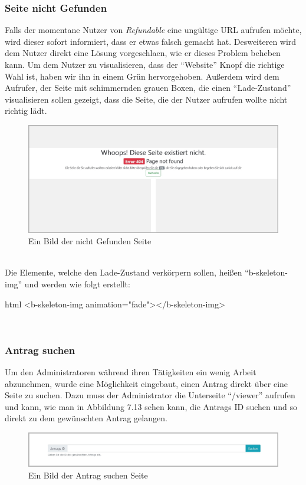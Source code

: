 \subsubsection{Seite nicht Gefunden}
\label{chapter:implementierung-frontend-komponenten-notfound}
Falls der momentane Nutzer von \textit{Refundable} eine ungültige URL aufrufen möchte, wird dieser sofort informiert, dass er etwas falsch gemacht hat. Desweiteren wird dem Nutzer direkt eine Lösung vorgeschlaen, wie er dieses Problem beheben kann. Um dem Nutzer zu visualisieren, dass der \enquote{Website} Knopf die richtige Wahl ist, haben wir ihn in einem Grün hervorgehoben. Außerdem wird dem Aufrufer, der Seite mit schimmernden grauen Boxen, die einen \enquote{Lade-Zustand} visualisieren sollen gezeigt, dass die Seite, die der Nutzer aufrufen wollte nicht richtig lädt.
\begin{figure}[H]
	\centering
	\includegraphics[width=1\linewidth]{images/website/notfound}
	\caption[Neuer Schulantrag]{Ein Bild der nicht Gefunden Seite}
	\label{fig:notfoundsite}
\end{figure}
~\\
Die Elemente, welche den Lade-Zustand verkörpern sollen, heißen \enquote{b-skeleton-img} und werden wie folgt erstellt:
\begin{code}{html}
	<b-skeleton-img animation="fade"></b-skeleton-img>
\end{code}
	\label{list:codeskeleton} ~\\

\newpage
\subsubsection{Antrag suchen}
\label{chapter:implementierung-frontend-komponenten-suchen}
Um den Administratoren während ihren Tätigkeiten ein wenig Arbeit abzunehmen, wurde eine Möglichkeit eingebaut, einen Antrag direkt über eine Seite zu suchen. Dazu muss der Administrator die Unterseite \enquote{/viewer} aufrufen und kann, wie man in Abbildung 7.13 sehen kann, die Antrags ID suchen und so direkt zu dem gewünschten Antrag gelangen.
\begin{figure}[H]
	\centering
	\includegraphics[width=1\linewidth]{images/website/search}
	\caption[Neuer Schulantrag]{Ein Bild der Antrag suchen Seite}
	\label{fig:searchsite}
\end{figure}
~\\


